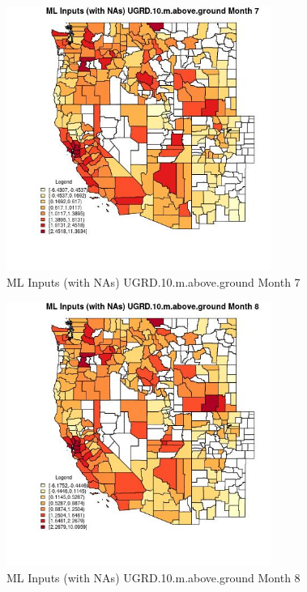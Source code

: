 \begin{figure} 
\centering  
\includegraphics[width=0.77\textwidth]{Code_Outputs/Report_ML_input_PM25_Step4_part_e_de_duplicated_aves_compiled_2019-05-21wNAs_CountyUGRD10mabovegroundmedianMonth7.jpg} 
\caption{\label{fig:Report_ML_input_PM25_Step4_part_e_de_duplicated_aves_compiled_2019-05-21wNAsCountyUGRD10mabovegroundmedianMonth7}ML Inputs (with NAs) UGRD.10.m.above.ground Month 7} 
\end{figure} 
 

\begin{figure} 
\centering  
\includegraphics[width=0.77\textwidth]{Code_Outputs/Report_ML_input_PM25_Step4_part_e_de_duplicated_aves_compiled_2019-05-21wNAs_CountyUGRD10mabovegroundmedianMonth8.jpg} 
\caption{\label{fig:Report_ML_input_PM25_Step4_part_e_de_duplicated_aves_compiled_2019-05-21wNAsCountyUGRD10mabovegroundmedianMonth8}ML Inputs (with NAs) UGRD.10.m.above.ground Month 8} 
\end{figure} 
 

